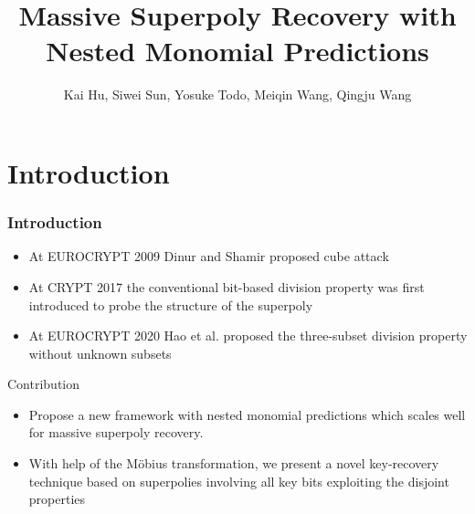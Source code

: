 \documentclass[notheorems,aspectratio=169]{beamer}
\title[Massive Superpoly Recovery with Nested Monomial Predictions]{Massive Superpoly Recovery with Nested Monomial Predictions}
\author{Kai Hu, Siwei Sun, Yosuke Todo, Meiqin Wang,  Qingju Wang}
\institute[HUST]{ASIACRYPT 2021}
\begin{document}
\begin{frame}
    \titlepage
\end{frame}

\section{ Introduction}
\begin{frame}
    \frametitle{Introduction}
    \begin{itemize}
        \item At EUROCRYPT 2009 Dinur and Shamir   proposed  cube attack
        \item At CRYPT 2017 the conventional bit-based division property was first introduced to probe the structure of the superpoly
        \item At EUROCRYPT 2020 Hao et al. proposed the three-subset division property without unknown subsets
    \end{itemize}
    \begin{block}{Contribution  }
        \begin{itemize}
         \item Propose a new framework with nested monomial predictions which scales well for massive superpoly recovery.\\
         \item With help of the Möbius transformation, we present a novel key-recovery technique based on superpolies involving all key bits exploiting the disjoint properties
        \end{itemize}
    \end{block}

\end{frame}
\end{document}
